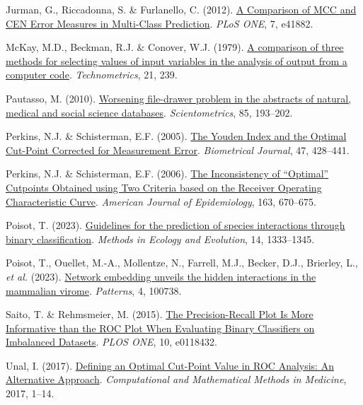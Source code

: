 \documentclass[
  letterpaper,
]{scrbook}
\newlength{\cslhangindent}
\newenvironment{CSLReferences}[2] %
 {\begin{list}{}{%
  \setlength{\itemindent}{0pt}
  \setlength{\leftmargin}{0pt}
  \setlength{\parsep}{0pt}
  \ifodd #1
   \setlength{\leftmargin}{\cslhangindent}
   \setlength{\itemindent}{-1\cslhangindent}
  \fi
  \setlength{\itemsep}{#2\baselineskip}}}
 {\end{list}}
\begin{document}
\begin{CSLReferences}{1}{0}
Jurman, G., Riccadonna, S. \& Furlanello, C. (2012).
\href{https://doi.org/10.1371/journal.pone.0041882}{A Comparison of MCC
and CEN Error Measures in Multi-Class Prediction}. \emph{PLoS ONE}, 7,
e41882.

McKay, M.D., Beckman, R.J. \& Conover, W.J. (1979).
\href{https://doi.org/10.2307/1268522}{A comparison of three methods for
selecting values of input variables in the analysis of output from a
computer code}. \emph{Technometrics}, 21, 239.

Pautasso, M. (2010).
\href{https://doi.org/10.1007/s11192-010-0233-5}{Worsening file-drawer
problem in the abstracts of natural, medical and social science
databases}. \emph{Scientometrics}, 85, 193--202.

Perkins, N.J. \& Schisterman, E.F. (2005).
\href{https://doi.org/10.1002/bimj.200410133}{The Youden Index and the
Optimal Cut-Point Corrected for Measurement Error}. \emph{Biometrical
Journal}, 47, 428--441.

Perkins, N.J. \& Schisterman, E.F. (2006).
\href{https://doi.org/10.1093/aje/kwj063}{The Inconsistency of
{``}Optimal{''} Cutpoints Obtained using Two Criteria based on the
Receiver Operating Characteristic Curve}. \emph{American Journal of
Epidemiology}, 163, 670--675.

Poisot, T. (2023).
\href{https://doi.org/10.1111/2041-210x.14071}{Guidelines for the
prediction of species interactions through binary classification}.
\emph{Methods in Ecology and Evolution}, 14, 1333--1345.

Poisot, T., Ouellet, M.-A., Mollentze, N., Farrell, M.J., Becker, D.J.,
Brierley, L., \emph{et al.} (2023).
\href{https://doi.org/10.1016/j.patter.2023.100738}{Network embedding
unveils the hidden interactions in the mammalian virome}.
\emph{Patterns}, 4, 100738.

Saito, T. \& Rehmsmeier, M. (2015).
\href{https://doi.org/10.1371/journal.pone.0118432}{The Precision-Recall
Plot Is More Informative than the ROC Plot When Evaluating Binary
Classifiers on Imbalanced Datasets}. \emph{PLOS ONE}, 10, e0118432.

Unal, I. (2017). \href{https://doi.org/10.1155/2017/3762651}{Defining an
Optimal Cut-Point Value in ROC Analysis: An Alternative Approach}.
\emph{Computational and Mathematical Methods in Medicine}, 2017, 1--14.


\end{CSLReferences}
\end{document}
